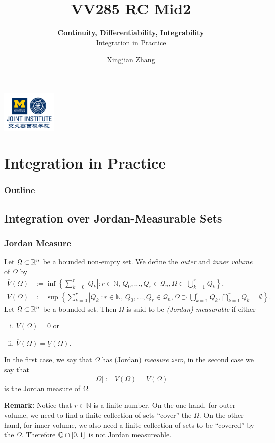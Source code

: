 \documentclass[10pt, t]{beamer}
\title{VV285 RC Mid2}
\subtitle{\textbf{Continuity, Differentiability, Integrability}\\\large  Integration in Practice}
\institute[UM-SJTU JI]{Univerity of Michigan-Shanghai Jiao Tong University Joint Institute}
\author{Xingjian Zhang}
\renewcommand{\emph}[1]{{\color{Turquoise3}\textsl{#1}}}
\newcommand{\N}{\mathbb{N}}
\begin{document}
\begin{frame}
    \titlepage
    \begin{center}
        \includegraphics[height=2cm]{logo2.png}
    \end{center}
\end{frame}

\section{Integration in Practice}
\begin{frame}
    \frametitle{Outline}
    \begin{spacing}{2.5}
        \tableofcontents[currentsubsection,hideothersubsections,sectionstyle=hide]
    \end{spacing}
\end{frame}
\subsection{Integration over Jordan-Measurable Sets}

\begin{frame}
    \frametitle{Jordan Measure}
    Let $\Omega\subset\mathbb{R}^n$ be a bounded non-empty set. We define the \emph{outer} and \emph{inner volume} of $\Omega$ by
    \small
    \begin{align*}
        \overline{V}(\Omega)  & :=\inf\left\{\sum_{k=0}^{r}|Q_k|:r\in\N,\,
        Q_0,\ldots,Q_r\in\mathcal{Q}_n,\Omega\subset
        \bigcup\limits_{k=1}^rQ_k\right\},                                 \\
        \underline{V}(\Omega) & :=\sup\left\{\sum_{k=0}^{r}|Q_k|:r\in\N,\,
        Q_0,\ldots,Q_r\in\mathcal{Q}_n,\Omega\supset
        \bigcup\limits_{k=1}^rQ_k,\bigcap\limits_{k=1}^rQ_k
        =\emptyset\right\}.
    \end{align*}
    Let $\Omega\subset\mathbb{R}^n$ be a bounded set. Then $\Omega$ is said to be \emph{(Jordan) measurable} if either
    \begin{enumerate}[(i)]
        \item $\overline{V}(\Omega)=0$ or
        \item $\overline{V}(\Omega)=\underline{V}
                  (\Omega)$.
    \end{enumerate}
    In the first case, we say that $\Omega$ has (Jordan) \emph{measure zero}, in the second case we say that
    \[|\Omega|:=\overline{V}(\Omega)=\underline{V}
        (\Omega)\]
    is the Jordan measure of $\Omega$.

    \textbf{Remark:} Notice that $r\in\N$ is a finite number. On the one hand, for outer volume, we need to find a finite collection of sets ``cover'' the $\Omega$. On the other hand, for inner volume, we also need a finite collection of sets to be ``covered'' by the $\Omega$. Therefore $\mathbb{Q}\cap[0,1]$ is not Jordan measureable.
\end{frame}
\end{document}
